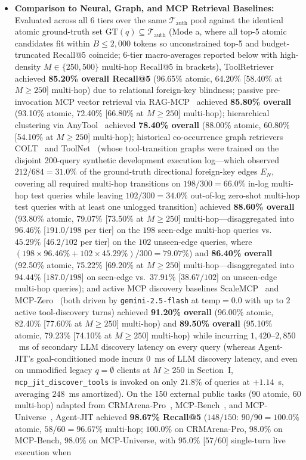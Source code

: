 \documentclass[conference,10pt]{IEEEtran}
\begin{document}
\begin{itemize}
    \item \textbf{Comparison to Neural, Graph, and MCP Retrieval Baselines:} Evaluated across all 6 tiers over the same $\mathcal{T}_{\text{auth}}$ pool against the identical atomic ground-truth set $\text{GT}(q) \subseteq \mathcal{T}_{\text{auth}}$ (Mode a, where all top-5 atomic candidates fit within $B \le 2{,}000$ tokens so unconstrained top-5 and budget-truncated Recall@5 coincide; 6-tier macro-averages reported below with high-density $M \in \{250, 500\}$ multi-hop Recall@5 in brackets), ToolRetriever~\cite{qin2024toolllm} achieved \textbf{85.20\% overall Recall@5} (96.65\% atomic, 64.20\% [58.40\% at $M \ge 250$] multi-hop) due to relational foreign-key blindness; passive pre-invocation MCP vector retrieval via RAG-MCP~\cite{gan2025ragmcp} achieved \textbf{85.80\% overall} (93.10\% atomic, 72.40\% [66.80\% at $M \ge 250$] multi-hop); hierarchical clustering via AnyTool~\cite{du2024anytool} achieved \textbf{78.40\% overall} (88.00\% atomic, 60.80\% [54.10\% at $M \ge 250$] multi-hop); historical co-occurrence graph retrievers COLT~\cite{qu2024colt} and ToolNet~\cite{liu2024toolnet} (whose tool-transition graphs were trained on the disjoint 200-query synthetic development execution log—which observed $212/684 = 31.0\%$ of the ground-truth directional foreign-key edges $E_N$, covering all required multi-hop transitions on $198/300 = 66.0\%$ in-log multi-hop test queries while leaving $102/300 = 34.0\%$ out-of-log zero-shot multi-hop test queries with at least one unlogged transition) achieved \textbf{88.60\% overall} (93.80\% atomic, 79.07\% [73.50\% at $M \ge 250$] multi-hop—disaggregated into $96.46\%$ [$191.0/198$ per tier] on the $198$ seen-edge multi-hop queries vs.\ $45.29\%$ [$46.2/102$ per tier] on the $102$ unseen-edge queries, where $(198 \times 96.46\% + 102 \times 45.29\%)/300 = 79.07\%$) and \textbf{86.40\% overall} (92.50\% atomic, 75.22\% [69.20\% at $M \ge 250$] multi-hop—disaggregated into $94.44\%$ [$187.0/198$] on seen-edge vs.\ $37.91\%$ [$38.67/102$] on unseen-edge multi-hop queries); and active MCP discovery baselines ScaleMCP~\cite{lumer2025scalemcp} and MCP-Zero~\cite{fei2025mcpzero} (both driven by \texttt{gemini-2.5-flash} at $\text{temp}=0.0$ with up to $2$ active tool-discovery turns) achieved \textbf{91.20\% overall} (96.00\% atomic, 82.40\% [77.60\% at $M \ge 250$] multi-hop) and \textbf{89.50\% overall} (95.10\% atomic, 79.23\% [74.10\% at $M \ge 250$] multi-hop) while incurring $1{,}420$--$2{,}850$~ms of secondary LLM discovery latency on every query (whereas Agent-JIT's goal-conditioned mode incurs $0$~ms of LLM discovery latency, and even on unmodified legacy $q = \emptyset$ clients at $M \ge 250$ in Section~I, \texttt{mcp\_jit\_discover\_tools} is invoked on only $21.8\%$ of queries at $+1.14$~s, averaging $248$~ms amortized). On the 150 external public tasks ($90$ atomic, $60$ multi-hop) adapted from CRMArena-Pro~\cite{huang2025crmarena}, MCP-Bench~\cite{wang2025mcpbench}, and MCP-Universe~\cite{luo2025mcpuniverse}, Agent-JIT achieved \textbf{98.67\% Recall@5} ($148/150$: $90/90 = 100.0\%$ atomic, $58/60 = 96.67\%$ multi-hop; $100.0\%$ on CRMArena-Pro, $98.0\%$ on MCP-Bench, $98.0\%$ on MCP-Universe, with $95.0\%$ [$57/60$] single-turn live execution when 
\end{itemize}
\end{document}
